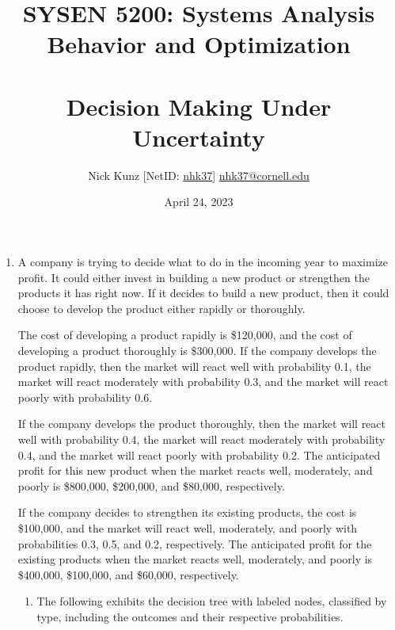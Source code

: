 \documentclass{article}
\begin{document}
\title{SYSEN 5200: Systems Analysis Behavior and Optimization\\~\\
    \Large Decision Making Under Uncertainty
}
\author{
    Nick Kunz [NetID: \url{nhk37}] \hyperlink{nhk37@cornell.edu}{nhk37@cornell.edu}}
\date{April 24, 2023}
\maketitle
\thispagestyle{fancy}

\begin{enumerate}

    \item A company is trying to decide what to do in the incoming year to maximize profit. It could either invest in building a new product or strengthen the products it has right now. If it decides to build a new product, then it could choose to develop the product either rapidly or thoroughly. 
    
    The cost of developing a product rapidly is \$120,000, and the cost of developing a product thoroughly is \$300,000. If the company develops the product rapidly, then the market will react well with probability 0.1, the market will react moderately with probability 0.3, and the market will react poorly with probability 0.6. 
    
    If the company develops the product thoroughly, then the market will react well with probability 0.4, the market will react moderately with probability 0.4, and the market will react poorly with probability 0.2. The anticipated profit for this new product when the market reacts well, moderately, and poorly is \$800,000, \$200,000, and \$80,000, respectively. 
    
    If the company decides to strengthen its existing products, the cost is \$100,000, and the market will react well, moderately, and poorly with probabilities 0.3, 0.5, and 0.2, respectively. The anticipated profit for the existing products when the market reacts well, moderately, and poorly is \$400,000, \$100,000, and \$60,000, respectively.

    \begin{enumerate}
        \item The following exhibits the decision tree with labeled nodes, classified by type, including the outcomes and their respective probabilities.\\

\end{enumerate}
\end{enumerate}
\end{document}
